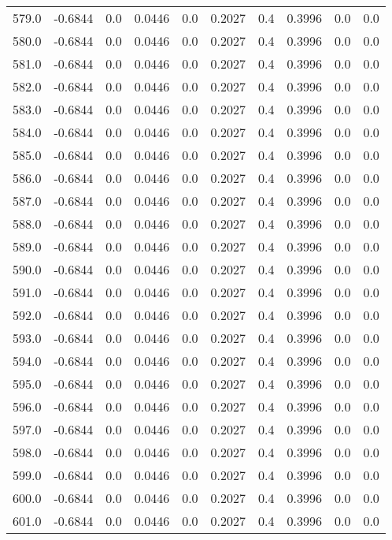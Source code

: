 \begin{longtable}{lrrrrrrrrr}
579.0 & -0.6844 & 0.0 & 0.0446 & 0.0 & 0.2027 & 0.4 & 0.3996 & 0.0 & 0.0 \\
580.0 & -0.6844 & 0.0 & 0.0446 & 0.0 & 0.2027 & 0.4 & 0.3996 & 0.0 & 0.0 \\
581.0 & -0.6844 & 0.0 & 0.0446 & 0.0 & 0.2027 & 0.4 & 0.3996 & 0.0 & 0.0 \\
582.0 & -0.6844 & 0.0 & 0.0446 & 0.0 & 0.2027 & 0.4 & 0.3996 & 0.0 & 0.0 \\
583.0 & -0.6844 & 0.0 & 0.0446 & 0.0 & 0.2027 & 0.4 & 0.3996 & 0.0 & 0.0 \\
584.0 & -0.6844 & 0.0 & 0.0446 & 0.0 & 0.2027 & 0.4 & 0.3996 & 0.0 & 0.0 \\
585.0 & -0.6844 & 0.0 & 0.0446 & 0.0 & 0.2027 & 0.4 & 0.3996 & 0.0 & 0.0 \\
586.0 & -0.6844 & 0.0 & 0.0446 & 0.0 & 0.2027 & 0.4 & 0.3996 & 0.0 & 0.0 \\
587.0 & -0.6844 & 0.0 & 0.0446 & 0.0 & 0.2027 & 0.4 & 0.3996 & 0.0 & 0.0 \\
588.0 & -0.6844 & 0.0 & 0.0446 & 0.0 & 0.2027 & 0.4 & 0.3996 & 0.0 & 0.0 \\
589.0 & -0.6844 & 0.0 & 0.0446 & 0.0 & 0.2027 & 0.4 & 0.3996 & 0.0 & 0.0 \\
590.0 & -0.6844 & 0.0 & 0.0446 & 0.0 & 0.2027 & 0.4 & 0.3996 & 0.0 & 0.0 \\
591.0 & -0.6844 & 0.0 & 0.0446 & 0.0 & 0.2027 & 0.4 & 0.3996 & 0.0 & 0.0 \\
592.0 & -0.6844 & 0.0 & 0.0446 & 0.0 & 0.2027 & 0.4 & 0.3996 & 0.0 & 0.0 \\
593.0 & -0.6844 & 0.0 & 0.0446 & 0.0 & 0.2027 & 0.4 & 0.3996 & 0.0 & 0.0 \\
594.0 & -0.6844 & 0.0 & 0.0446 & 0.0 & 0.2027 & 0.4 & 0.3996 & 0.0 & 0.0 \\
595.0 & -0.6844 & 0.0 & 0.0446 & 0.0 & 0.2027 & 0.4 & 0.3996 & 0.0 & 0.0 \\
596.0 & -0.6844 & 0.0 & 0.0446 & 0.0 & 0.2027 & 0.4 & 0.3996 & 0.0 & 0.0 \\
597.0 & -0.6844 & 0.0 & 0.0446 & 0.0 & 0.2027 & 0.4 & 0.3996 & 0.0 & 0.0 \\
598.0 & -0.6844 & 0.0 & 0.0446 & 0.0 & 0.2027 & 0.4 & 0.3996 & 0.0 & 0.0 \\
599.0 & -0.6844 & 0.0 & 0.0446 & 0.0 & 0.2027 & 0.4 & 0.3996 & 0.0 & 0.0 \\
600.0 & -0.6844 & 0.0 & 0.0446 & 0.0 & 0.2027 & 0.4 & 0.3996 & 0.0 & 0.0 \\
601.0 & -0.6844 & 0.0 & 0.0446 & 0.0 & 0.2027 & 0.4 & 0.3996 & 0.0 & 0.0 \\

\end{longtable}
